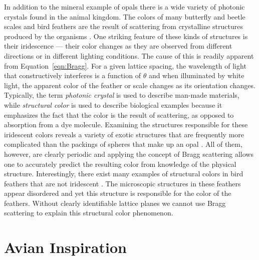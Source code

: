In addition to the mineral example of opals there is a wide variety of photonic crystals found in the animal kingdom.
The colors of many butterfly and beetle scales and bird feathers are the result of scattering from crystalline structures produced by the organisms \cite{Vukusic:2003p1380, Welch:2007p1313,Srinivasarao:1999p9327}.
One striking feature of these kinds of structures is their iridescence --- their color changes as they are observed from different directions or in different lighting conditions.
The cause of this is readily apparent from Equation~\ref{eqn:Bragg}.
For a given lattice spacing, the wavelength of light that constructively interferes is a function of $\theta$ and when illuminated by white light, the apparent color of the feather or scale changes as its orientation changes.
Typically, the term \emph{photonic crystal} is used to describe man-made materials, while \emph{structural color} is used to describe biological examples because it emphasizes the fact that the color is the result of scattering, as opposed to absorption from a dye molecule.
Examining the structures responsible for these iridescent colors reveals a variety of exotic structures that are frequently more complicated than the packings of spheres that make up an opal \cite{Vukusic:2003p1380, Welch:2007p1313,Srinivasarao:1999p9327}.
All of them, however, are clearly periodic and applying the concept of Bragg scattering allows one to accurately predict the resulting color from knowledge of the physical structure.
Interestingly, there exist many examples of structural colors in bird feathers that are not iridescent \cite{Prum:1998p1228, Saranathan:2011}.
The microscopic structures in these feathers appear disordered and yet this structure is responsible for the color of the feathers.
Without clearly identifiable lattice planes we cannot use Bragg scattering to explain this structural color phenomenon.


\section{Avian Inspiration}

